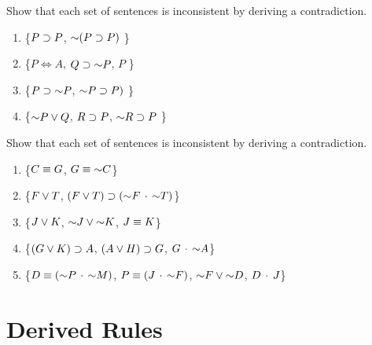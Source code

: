 {\noindent\problempart   
\label{pr.derivation2.inconsistent2}
Show that each set of sentences is inconsistent by deriving a contradiction.
\begin{enumerate}
\item \{$P \supset P$, $\mathord{\sim} (P \supset P)$  \}\vspace{.5ex}
\item \{$P \iff A$, $Q \supset \mathord{\sim} P$, $P$ \}\vspace{.5ex}
\item \{$P \supset \mathord{\sim} P$, $\mathord{\sim} P \supset P)$ \}\vspace{.5ex}
\item \{$\mathord{\sim} P \vee Q$, $R \supset P$, $\mathord{\sim} R \supset P$  \}\vspace{.5ex}
\end{enumerate}



\noindent\problempart   
\label{pr.derivation2.inconsistent3}
Show that each set of sentences is inconsistent by deriving a contradiction.
\begin{enumerate}
\item \{$C \equiv G$, $G \equiv \mathord{\sim} C$\}\vspace{.5ex}
\item \{$F \vee T$, $(F \vee T) \supset (\mathord{\sim} F \,\cdot\, \mathord{\sim} T)$\}\vspace{.5ex}
\item \{$J \vee K$, $\mathord{\sim} J \vee \mathord{\sim} K$, $J \equiv K$\}\vspace{.5ex}
\item \{$(G \vee K) \supset A$, $(A \vee H) \supset G$, $G \,\cdot\, \mathord{\sim} A$\}\vspace{.5ex}
\item \{$D \equiv(\mathord{\sim} P \,\cdot\, \mathord{\sim} M)$, $P \equiv (J \,\cdot\, \mathord{\sim} F)$, $\mathord{\sim} F \vee \mathord{\sim} D$, $D \,\cdot\, J$\}\vspace{.5ex}
\end{enumerate}














\section{Derived Rules}
\setlength{\parindent}{1em}

}

